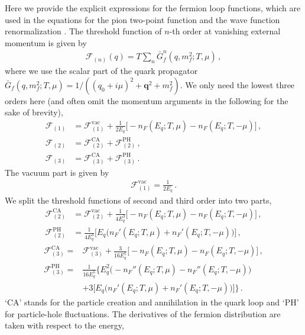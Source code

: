 \documentclass[reprint,english,superscriptaddress,preprintnumbers,amsmath,amssymb,aps,prd]{revtex4-2}
\begin{document}
Here we provide the explicit expressions for the fermion loop functions, which are used in the equations for the pion two-point function  and the wave function renormalization . The threshold function of $n$-th order at vanishing external momentum is given by
%
\begin{align}
\mathcal{F}_{(n)}(q)=T\sum_n \bar{G}^n_{f}(q,m^2_f;T,\mu)\,,
\end{align}
%
where we use the scalar part of the quark propagator $\bar{G}_f(q,m^2_f;T,\mu)=1/((q_0+i\mu)^2+\boldsymbol{q}^2+m^2_f)$. We only need the lowest three orders here (and often omit the momentum arguments in the following for the sake of brevity),
%
\begin{align}\label{eq:threshold_fun}
\mathcal{F}_{(1)}&=\mathcal{F}^{\mathrm{vac}}_{(1)}+\frac{1}{2E_q}\bigg[-n_F(E_q;T,\mu)-n_F(E_q;T,-\mu)\bigg]\,,\\[2ex]
\mathcal{F}_{(2)}&=\mathcal{F}^{\mathrm{CA}}_{(2)}+\mathcal{F}^{\mathrm{PH}}_{(2)}\,,\\[2ex]
\mathcal{F}_{(3)}&=\mathcal{F}^{\mathrm{CA}}_{(3)}+\mathcal{F}^{\mathrm{PH}}_{(3)}\,.
\end{align}
%
The vacuum part is given by
%
\begin{align}
\mathcal{F}^{\mathrm{vac}}_{(1)}=\frac{1}{2E_q}\,.
\end{align}
%
We split the threshold functions of second and third order into two parts,
%
\begin{align}\label{eq:threshold_fun_f2}
\mathcal{F}^{\mathrm{CA}}_{(2)}&=\mathcal{F}^{\mathrm{vac}}_{(2)}+\frac{1}{4E_q^{3}}\bigg[-n_F(E_q;T,\mu)-n_F(E_q;T,-\mu)\bigg]\,,\nonumber\\[2ex]
\mathcal{F}^{\mathrm{PH}}_{(2)}&=\frac{1}{4E_q^{3}}\bigg[E_q\Big(n_F'(E_q;T,\mu)+n_F'(E_q;T,-\mu)\Big)\bigg]\,,
\end{align}
%
%
\begin{align}\label{eq:threshold_fun_f3}
\mathcal{F}^{\mathrm{CA}}_{(3)}=&\mathcal{F}^{\mathrm{vac}}_{(3)}+\frac{3}{16E_q^{5}}\bigg[-n_F(E_q;T,\mu)-n_F(E_q;T,-\mu)\bigg]\,,\nonumber\\[2ex]
\mathcal{F}^{\mathrm{PH}}_{(3)}=&\frac{1}{16E_q^{5}}\Bigg\{E_q^2\Big(-n_F''(E_q;T,\mu)-n_F''(E_q;T,-\mu)\Big)\nonumber\\[2ex]
&+3\bigg[E_q\Big(n_F'(E_q;T,\mu)+n_F'(E_q;T,-\mu)\Big)\bigg]\Bigg\}\,.
\end{align}
%
`CA' stands for the particle creation and annihilation in the quark loop and `PH' for particle-hole fluctuations. The derivatives of the fermion distribution are taken with respect to the energy,
\end{document}
